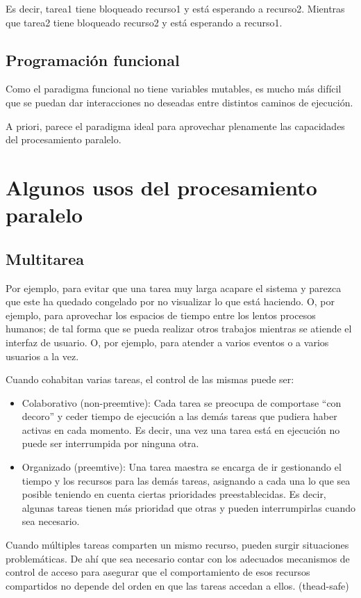 \documentclass[spanish,12pt,a4paper,final,oneside]{book}
\begin{document}
Es decir, tarea1 tiene bloqueado recurso1 y está esperando a recurso2. Mientras que tarea2 tiene bloqueado recurso2 y está esperando a recurso1.


\subsection{Programación funcional}
Como el paradigma funcional no tiene variables mutables, es mucho más difícil que se puedan dar interacciones no deseadas entre distintos caminos de ejecución.

A priori, parece el paradigma ideal para aprovechar plenamente las capacidades del procesamiento paralelo.



\section{Algunos usos del procesamiento paralelo}


\subsection{Multitarea}
Por ejemplo, para evitar que una tarea muy larga acapare el sistema y parezca que este ha quedado congelado por no visualizar lo que está haciendo. O, por ejemplo, para aprovechar los espacios de tiempo entre los lentos procesos humanos; de tal forma que se pueda realizar otros trabajos mientras se atiende el interfaz de usuario. O, por ejemplo, para atender a varios eventos o a varios usuarios a la vez.

Cuando cohabitan varias tareas, el control de las mismas puede ser:
\begin{itemize}
\item Colaborativo (non-preemtive): Cada tarea se preocupa de comportase ``con decoro'' y ceder tiempo de ejecución a las demás tareas que pudiera haber activas en cada momento. Es decir, una vez una tarea está en ejecución no puede ser interrumpida por ninguna otra.
\item Organizado (preemtive): Una tarea maestra se encarga de ir gestionando el tiempo y los recursos para las demás tareas, asignando a cada una lo que sea posible teniendo en cuenta ciertas prioridades preestablecidas. Es decir, algunas tareas tienen más prioridad que otras y pueden interrumpirlas cuando sea necesario.
\end{itemize}

Cuando múltiples tareas comparten un mismo recurso, pueden surgir situaciones problemáticas. De ahí que sea necesario contar con los adecuados mecanismos de control de acceso para asegurar que el comportamiento de esos recursos compartidos no depende del orden en que las tareas accedan a ellos. (thead-safe)
\end{document}
